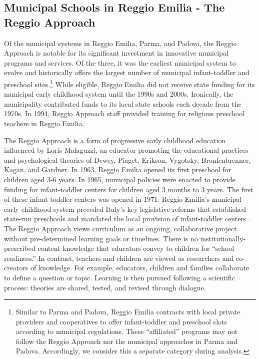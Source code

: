 
\subsection{Municipal Schools in Reggio Emilia - The Reggio Approach}

Of the municipal systems in Reggio Emilia, Parma, and Padova, the Reggio Approach is notable for its significant investment in innovative municipal programs and services. Of the three, it was the earliest municipal system to evolve and historically offers the largest number of municipal infant-toddler and preschool sites.\footnote{Similar to Parma and Padova, Reggio Emilia contracts with local private providers and cooperatives to offer infant-toddler and preschool slots according to municipal regulations. These ``affiliated'' programs may not follow the Reggio Approach nor the municipal approaches in Parma and Padova. Accordingly, we consider this a separate category during analysis.} While eligible, Reggio Emilia did not receive state funding for its municipal early childhood system until the 1990s and 2000s. Ironically, the municipality contributed funds to its local state schools each decade from the 1970s. In 1994, Reggio Approach staff provided training for religious preschool teachers in Reggio Emilia. 

The Reggio Approach is a form of progressive early childhood education influenced by Loris Malaguzzi, an educator promoting the educational practices and psychological theories of Dewey, Piaget, Erikson, Vygotsky, Bronfenbrenner, Kagan, and Gardner. In 1963, Reggio Emilia opened its first preschool for children aged 3-6 years. In 1965, municipal policies were enacted to provide funding for infant-toddler centers for children aged 3 months to 3 years. The first of these infant-toddler centers was opened in 1971. Reggio Emilia's municipal early childhood system preceded Italy's key legislative reforms that established state-run preschools and mandated the local provision of infant-toddler centers \citep{Cagliari-etal-eds_2016_BOOK_Loris-Malaguzzi}. The Reggio Approach views curriculum as an ongoing, collaborative project without pre-determined learning goals or timelines. There is no institutionally-prescribed content knowledge that educators convey to children for ``school readiness.'' In contrast, teachers and children are viewed as researchers and co-creators of knowledge. For example, educators, children and families collaborate to define a question or topic. Learning is then pursued following a scientific process: theories are shared, tested, and revised through dialogue. 

